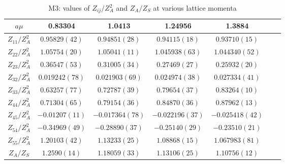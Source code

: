 \begin{table}
\begin{center}
\caption{\label{tab:M3renormvals}M3: values of $Z_{ij}/Z_A^2$ and $Z_A/Z_S$ at various lattice momenta}
\begin{tabular}{c|c c c c c c}
\hline
\hline
$a\mu$ & 0.83304 & 1.0413 & 1.24956 & 1.3884 \\
\hline
$Z_{11}/Z_A^2$ & $0.95829(42)$ & $0.94851(28)$ & $0.94115(18)$ & $0.93710(15)$ \\
\hline
$Z_{22}/Z_A^2$ & $1.05754(20)$ & $1.05041(11)$ & $1.045938(63)$ & $1.044340(52)$ \\
$Z_{23}/Z_A^2$ & $0.36547(53)$ & $0.31005(34)$ & $0.27469(27)$ & $0.25932(20)$ \\
$Z_{32}/Z_A^2$ & $0.019242(78)$ & $0.021903(69)$ & $0.024974(38)$ & $0.027334(41)$ \\
$Z_{33}/Z_A^2$ & $0.63257(77)$ & $0.72787(39)$ & $0.79654(37)$ & $0.83264(10)$ \\
\hline
$Z_{44}/Z_A^2$ & $0.71304(65)$ & $0.79154(36)$ & $0.84870(36)$ & $0.87962(13)$ \\
$Z_{45}/Z_A^2$ & $-0.01207(11)$ & $-0.017364(78)$ & $-0.022196(37)$ & $-0.025418(42)$ \\
$Z_{54}/Z_A^2$ & $-0.34969(49)$ & $-0.28890(37)$ & $-0.25140(29)$ & $-0.23510(21)$ \\
$Z_{55}/Z_A^2$ & $1.20103(42)$ & $1.13233(25)$ & $1.08868(15)$ & $1.067983(81)$ \\
\hline
$Z_A/Z_S$ & $1.2590(14)$ & $1.18059(33)$ & $1.13106(25)$ & $1.10756(12)$ \\
\hline
\hline
\end{tabular}
\end{center}
\end{table}